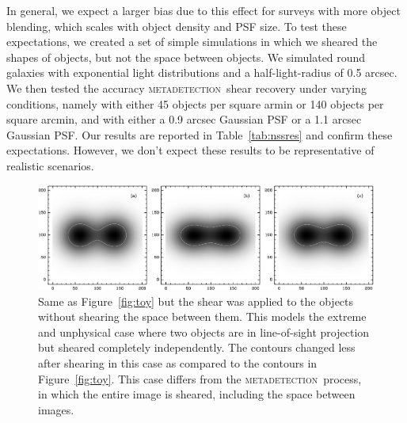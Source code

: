 \documentclass[iop, appendixfloats, numberedappendix, apj]{emulateapj}
\newcommand{\mdet}{\textsc{metadetection}}
\begin{document}
In general, we expect a larger bias due to this effect for surveys with more
object blending, which scales with object density and PSF size.  To test these
expectations, we created a set of simple simulations in which we sheared the
shapes of objects, but not the space between objects.  We simulated round
galaxies with exponential light distributions and a half-light-radius of 0.5
arcsec. We then tested the accuracy \mdet\ shear recovery under varying
conditions, namely with either 45 objects per square armin or 140 objects per
square arcmin, and with either a 0.9 arcsec Gaussian PSF or a 1.1 arcsec
Gaussian PSF. Our results are reported in Table~\ref{tab:nssres} and confirm
these expectations. However, we don't expect these results to be representative
of realistic scenarios.


\begin{figure}
    \begin{center}
        \includegraphics[width=\textwidth]{figures/toy-no-full-scene.png}

        \caption{Same as Figure~\ref{fig:toy} but the shear was applied to the
        objects without shearing the space between them. This models the extreme
        and unphysical case where two objects are in line-of-sight projection but
        sheared completely independently.  The contours changed less after shearing
        in this case as compared to the contours in Figure~\ref{fig:toy}.  This
        case differs from the \mdet\ process, in which the entire image is sheared,
        including the space between images.  \label{fig:toynoscene} }
    \end{center}

\end{figure}
\end{document}
